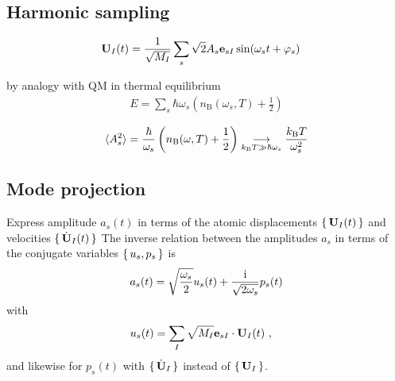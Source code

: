 \subsection{Harmonic sampling}

\begin{align}
{\bf U}_I (t) 
& = \frac{1}{\sqrt{M_I}} \sum_s \sqrt 2 A_s {\bf e}_{sI} \sin (\omega_s t + \varphi_s)
\end{align}

by analogy with QM in thermal equilibrium
\begin{align}
E
=\sum_{s} \hbar \omega_{s}\left(n_{\mathrm{B}}\left(\omega_{s}, T\right)+\frac{1}{2}\right)
\end{align}

\begin{align}
\braket{A_{s}^{2}}
= \frac{\hbar}{\omega_{s}}\left(n_{\mathrm{B}}(\omega, T)+\frac{1}{2}\right)
\underset{k_{\rm B} T \gg \hbar \omega_s}{\longrightarrow} \frac{k_{\rm B} T}{\omega_s^2}
\end{align}

\subsection{Mode projection}

Express amplitude $a_s (t)$ in terms of the atomic displacements $\set{{\bf U}_I (t)}$ and velocities $\set{\dot{{\bf U}}_I (t)}$ 
The inverse relation between the amplitudes $a_s$ in terms of the conjugate variables $\set{u_s, p_s}$ is
\begin{align}
a_s (t) = \sqrt{\frac{\omega_s}{2}} u_s (t) + \frac{{\rm i}}{\sqrt{2 \omega_s}} p_s (t)
\end{align}
with
\begin{subequations}
	\label{eq:mode.projection.u_s}
	\begin{align}
	u_s (t) 
	& = \sum_I \sqrt{M_I} {\bf e}_{sI} \cdot {\bf U}_I (t) ~,
	\end{align}
\end{subequations}
and likewise for $p_s (t)$ with $\set{\dot{{\bf U}}_I}$ instead of $\set{{\bf U}_I}$.



